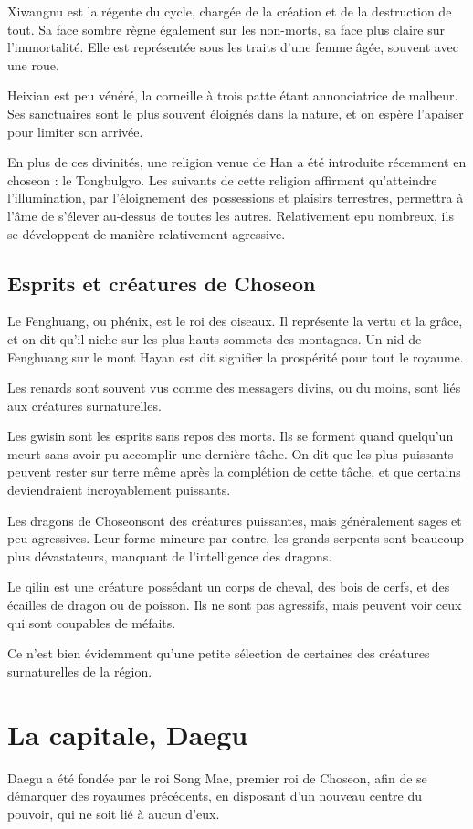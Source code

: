 \documentclass[10pt,a4paper]{book}
\newcommand{\nomroyaume}{Choseon}
\begin{document}
Xiwangnu est la régente du cycle, chargée de la création et de la destruction de tout. Sa face sombre règne également sur les non-morts, sa face plus claire sur l'immortalité. Elle est représentée sous les traits d'une femme âgée, souvent avec une roue.

Heixian est peu vénéré, la corneille à trois patte étant annonciatrice de malheur. Ses sanctuaires sont le plus souvent éloignés dans la nature, et on espère l'apaiser pour limiter son arrivée.

En plus de ces divinités, une religion venue de Han a été introduite récemment en choseon : le Tongbulgyo. Les suivants de cette religion affirment qu'atteindre l'illumination, par l'éloignement des possessions et plaisirs terrestres, permettra à l'âme de s'élever au-dessus de toutes les autres. Relativement epu nombreux, ils se développent de manière relativement agressive.
\subsection{Esprits et créatures de \nomroyaume}
Le Fenghuang, ou phénix, est le roi des oiseaux. Il représente la vertu et la grâce, et on dit qu'il niche sur les plus hauts sommets des montagnes. Un nid de Fenghuang sur le mont Hayan est dit signifier la prospérité pour tout le royaume.

Les renards sont souvent vus comme des messagers divins, ou du moins, sont liés aux créatures surnaturelles.

Les gwisin sont les esprits sans repos des morts. Ils se forment quand quelqu'un meurt sans avoir pu accomplir une dernière tâche. On dit que les plus puissants peuvent rester sur terre même après la complétion de cette tâche, et que certains deviendraient incroyablement puissants.

Les dragons de \nomroyaume sont des créatures puissantes, mais généralement sages et peu agressives. Leur forme mineure par contre, les grands serpents sont beaucoup plus dévastateurs, manquant de l'intelligence des dragons.

Le qilin est une créature possédant un corps de cheval, des bois de cerfs, et des écailles de dragon ou de poisson. Ils ne sont pas agressifs, mais peuvent voir ceux qui sont coupables de méfaits.

Ce n'est bien évidemment qu'une petite sélection de certaines des créatures surnaturelles de la région.
\section{La capitale, Daegu}
Daegu a été fondée par le roi Song Mae, premier roi de \nomroyaume, afin de se démarquer des royaumes précédents, en disposant d'un nouveau centre du pouvoir, qui ne soit lié à aucun d'eux.
\end{document}
